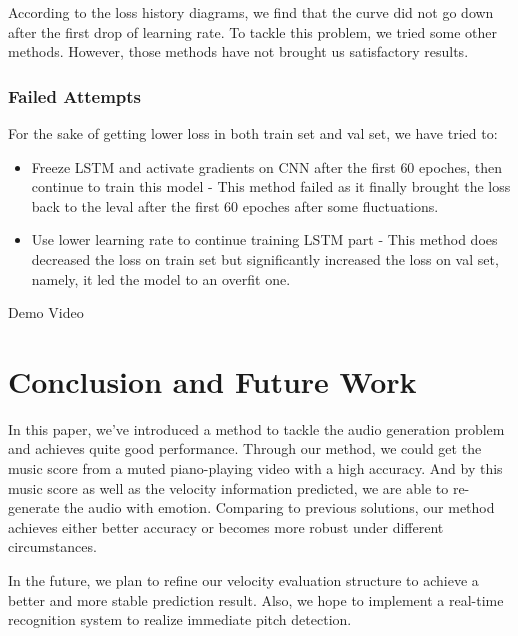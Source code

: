 \documentclass[10pt,twocolumn,letterpaper]{article}
\begin{document}
According to the loss history diagrams, we find that the curve did not go down after the first drop of learning rate. To tackle this problem, we tried some other methods. However, those methods have not brought us satisfactory results.

\subsubsection{Failed Attempts}

For the sake of getting lower loss in both train set and val set, we have tried to:

\begin{itemize}

\item Freeze LSTM and activate gradients on CNN after the first \(60\) epoches, then continue to train this model - This method failed as it finally brought the loss back to the leval after the first \(60\) epoches after some fluctuations.

\item Use lower learning rate to continue training LSTM part - This method does decreased the loss on train set but significantly increased the loss on val set, namely, it led the model to an overfit one. 

  \end{itemize}

Demo Video

\section{Conclusion and Future Work}

In this paper, we've introduced a method to tackle the audio generation problem and achieves quite good performance.
Through our method, we could get the music score from a muted piano-playing video with a high accuracy.
And by this music score as well as the velocity information predicted, we are able to re-generate the audio with emotion.
Comparing to previous solutions, our method achieves either better accuracy or becomes more robust under different circumstances.

In the future, we plan to refine our velocity evaluation structure to achieve a better and more stable prediction result.
Also, we hope to implement a real-time recognition system to realize immediate pitch detection.


{\small


}
\end{document}
